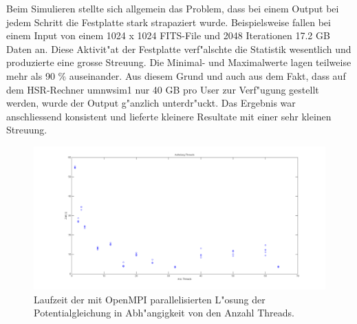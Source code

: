 \begin{refsection}
Beim Simulieren stellte sich allgemein das Problem, dass
bei einem Output bei jedem Schritt die Festplatte stark strapaziert
wurde. Beispielsweise fallen bei einem Input von einem 1024 x 1024
FITS-File und 2048 Iterationen 17.2 GB Daten an. Diese Aktivit"at der
Festplatte verf"alschte die Statistik wesentlich und produzierte eine
grosse Streuung. Die Minimal- und Maximalwerte lagen teilweise mehr als
90 \% auseinander. Aus diesem Grund und auch aus dem Fakt, dass auf dem
HSR-Rechner umnwsim1 nur 40 GB pro User zur Verf"ugung gestellt werden,
wurde der Output g"anzlich unterdr"uckt. Das Ergebnis war anschliessend
konsistent und lieferte kleinere Resultate mit einer sehr kleinen
Streuung. 
	
\begin{figure}
\centering 
\includegraphics[width=\hsize]{potential/images/Resultate/threads}
\caption{Laufzeit der mit OpenMPI parallelisierten L"osung der
Potentialgleichung in Abh"angigkeit von den Anzahl Threads.}
\label{threads}
\end{figure}


\end{refsection}
